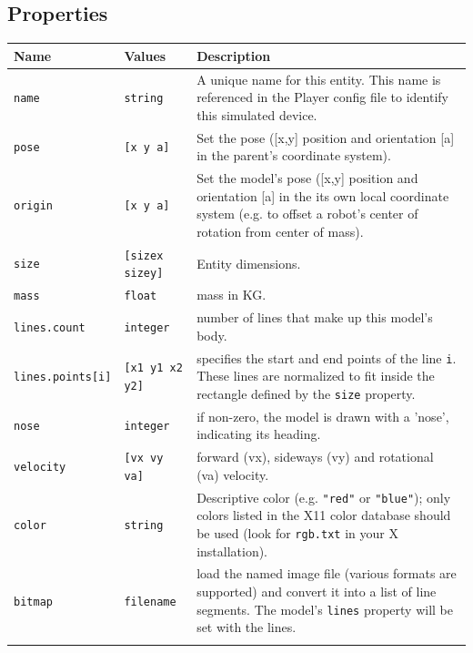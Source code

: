 \documentclass[letter,11pt,twoside]{report}
\begin{document}
\subsection*{Properties}
\begin{tabularx}{\columnwidth}{llX}
\hline
Name & Values & Description \\
\hline

\verb'name' & \verb'string' & A unique name for this entity. This name
is referenced in the Player config file to identify this simulated
device.\\

\verb'pose' & \verb'[x y a]' & Set the pose ([x,y] position and
orientation [a] in the parent's coordinate system).\\

\verb'origin' & \verb'[x y a]' & Set the model's pose ([x,y] position
and orientation [a] in the its own local coordinate system (e.g. to
offset a robot's center of rotation from center of mass).\\

\verb'size' & \verb'[sizex sizey]' & Entity dimensions.\\ 

\verb'mass'& \verb'float' & mass in KG.\\

\verb'lines.count'& \verb'integer' & number of lines that make up this
model's body.\\

\verb'lines.points[i]' & \verb'[x1 y1 x2 y2]' & specifies the start
and end points of the line \verb'i'. These lines are normalized to fit
inside the rectangle defined by the \verb'size' property.\\

\verb'nose'& \verb'integer' & if non-zero, the model is drawn with a
'nose', indicating its heading.\\

\verb'velocity'& \verb'[vx vy va]' & forward (vx), sideways (vy)
and rotational (va) velocity.\\

\verb'color' & \verb'string' & Descriptive color (e.g. \verb'"red"' or
\verb'"blue"'); only colors listed in the X11 color database should be used
(look for \verb'rgb.txt' in your X installation).\\

\verb'bitmap' & \verb'filename' & load the named image file (various
formats are supported) and convert it into a list of line
segments. The model's \verb'lines' property will be set with the
lines.\\


\\
\hline
\end{tabularx}
\end{document}

